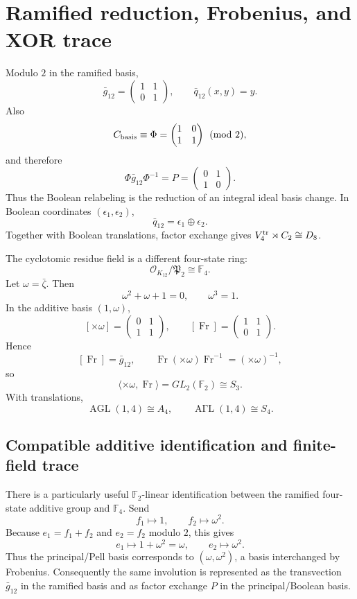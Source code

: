 \documentclass[11pt]{article}
\theoremstyle{remark}
\newcommand{\F}{\mathbb F}
\newcommand{\OO}{\mathcal O}
\newcommand{\Fr}{\operatorname{Fr}}
\begin{document}
\section{Ramified reduction, Frobenius, and XOR trace}

Modulo $2$ in the ramified basis,
\[
\bar g_{12}
=\begin{pmatrix}1&1\\0&1\end{pmatrix},
\qquad
\bar q_{12}(x,y)=y.
\]
Also
\[
C_{\rm basis}\equiv
\Phi=\begin{pmatrix}1&0\\1&1\end{pmatrix}\pmod2,
\]
and therefore
\[
\Phi\bar g_{12}\Phi^{-1}
=P=\begin{pmatrix}0&1\\1&0\end{pmatrix}.
\]
Thus the Boolean relabeling is the reduction of an integral ideal basis
change.  In Boolean coordinates $(\epsilon_1,\epsilon_2)$,
\[
\bar q_{12}=\epsilon_1\oplus\epsilon_2.
\]
Together with Boolean translations, factor exchange gives
$V_4^{\rm tr}\rtimes C_2\cong D_8$.

The cyclotomic residue field is a different four-state ring:
\[
\boxed{\OO_{K_{12}}/\mathfrak P_2\cong\F_4.}
\]
Let $\omega=\bar\zeta$.  Then
\[
\omega^2+\omega+1=0,
\qquad \omega^3=1.
\]
In the additive basis $(1,\omega)$,
\[
[\times\omega]=\begin{pmatrix}0&1\\1&1\end{pmatrix},
\qquad
[\Fr]=\begin{pmatrix}1&1\\0&1\end{pmatrix}.
\]
Hence
\[
\boxed{[\Fr]=\bar g_{12}},
\qquad
\Fr(\times\omega)\Fr^{-1}=(\times\omega)^{-1},
\]
so
\[
\langle\times\omega,\Fr\rangle
=GL_2(\F_2)\cong S_3.
\]
With translations,
\[
\operatorname{AGL}(1,4)\cong A_4,
\qquad
\operatorname{A\Gamma L}(1,4)\cong S_4.
\]

\subsection{Compatible additive identification and finite-field trace}

There is a particularly useful $\F_2$-linear identification between the
ramified four-state additive group and $\F_4$.  Send
\[
\boxed{f_1\longmapsto1,
\qquad f_2\longmapsto\omega^2.}
\]
Because $e_1=f_1+f_2$ and $e_2=f_2$ modulo $2$, this gives
\[
e_1\longmapsto1+\omega^2=\omega,
\qquad
e_2\longmapsto\omega^2.
\]
Thus the principal/Pell basis corresponds to $(\omega,\omega^2)$, a basis
interchanged by Frobenius.  Consequently the same involution is represented
as the transvection $\bar g_{12}$ in the ramified basis and as factor exchange
$P$ in the principal/Boolean basis.
\end{document}
